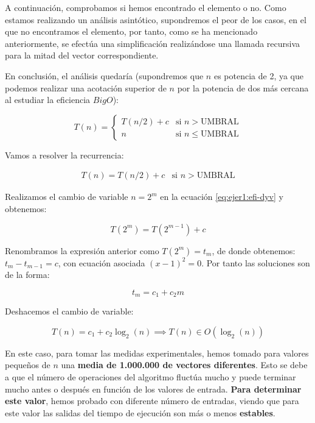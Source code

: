 A continuación, comprobamos si hemos encontrado el elemento o no. Como estamos realizando un análisis asintótico, supondremos
el peor de los casos, en el que no encontramos el elemento, por tanto, como se ha mencionado anteriormente,
se efectúa una simplificación realizándose una llamada recursiva para la mitad del vector correspondiente.

En conclusión, el análisis quedaría (supondremos que $n$ es potencia de 2, ya que podemos realizar una acotación 
superior de $n$ por la potencia de dos más cercana al estudiar la eficiencia $Big O$): 

\begin{equation}
    T(n) = \left\{ \begin{array}{lr} T(n/2) + c & \text{si } n > \text{UMBRAL}\\ n & \text{si } n \leqslant \text{UMBRAL} \end{array} \right.
    \label{eq:1a-efi-dyv-rec}
\end{equation}

Vamos a resolver la recurrencia:

\begin{equation}
    \begin{array}{lr}  T(n) =  T(n/2) + c & \text{si } n > \text{UMBRAL} \end{array}
    \label{eq:ejer1:efi-dyv}
\end{equation}

Realizamos el cambio de variable $n = 2^{m}$ en la ecuación \ref{eq:ejer1:efi-dyv} y obtenemos:

\begin{equation*}
    T(2^{m}) =  T(2^{m-1}) + c 
\end{equation*}

Renombramos la expresión anterior como $T(2^{m}) = t_{m}$, de donde obtenemos: $t_{m} - t_{m-1} = c$, con
ecuación asociada $(x-1)^{2} = 0$. Por tanto las soluciones son de la forma: 

\begin{equation*}
    t_{m} = c_{1} + c_{2}m
\end{equation*}

Deshacemos el cambio de variable:

\begin{equation}
    T(n) = c_{1} + c_{2} \log_2(n) \implies \boxed{T(n) \in O(\log_2(n))}
    \label{eq:1a-eficiencia-lineal}
\end{equation}

En este caso, para tomar las medidas experimentales, hemos tomado para valores pequeños de $n$ una 
\textbf{media de 1.000.000 de vectores diferentes}. Esto se debe a que el número de operaciones del 
algoritmo fluctúa mucho y puede terminar mucho antes o después en función
de los valores de entrada. \textbf{Para determinar este valor}, hemos probado con diferente número de entradas, 
viendo que para este valor las salidas del tiempo de ejecución son más o menos \textbf{estables}. 

